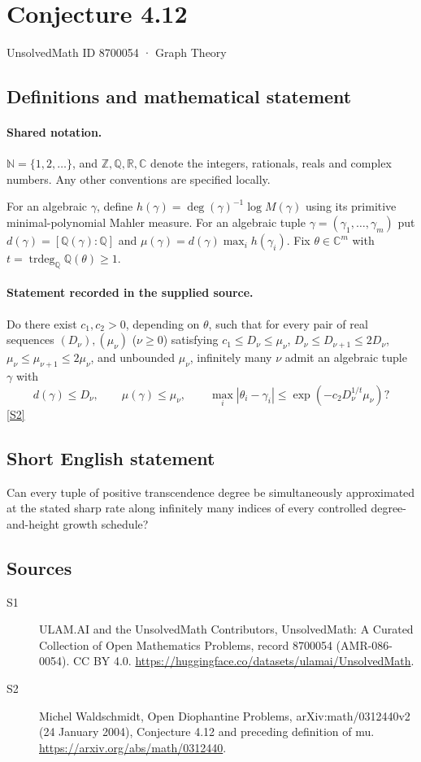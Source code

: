 \documentclass[11pt]{article}
\newcommand{\sref}[2]{\hyperlink{source:#1:#2}{[S#2]}}
\begin{document}
\setcounter{section}{8700053}
\section{Conjecture 4.12}\label{8700054}
{\small\sffamily UnsolvedMath ID 8700054 · Graph Theory}
\subsection{Definitions and mathematical statement}

\paragraph{Shared notation.}$\mathbb N=\{1,2,\ldots\}$, and $\mathbb Z,\mathbb Q,\mathbb R,\mathbb C$ denote the integers, rationals, reals and complex numbers. Any other conventions are specified locally.


For an algebraic $\gamma$, define $h(\gamma)=\deg(\gamma)^{-1}\log M(\gamma)$ using its primitive minimal-polynomial Mahler measure. For an algebraic tuple $\gamma=(\gamma_1,\ldots,\gamma_m)$ put $d(\gamma)=[\mathbb Q(\gamma):\mathbb Q]$ and $\mu(\gamma)=d(\gamma)\max_i h(\gamma_i)$. Fix $\theta\in\mathbb C^m$ with $t=\operatorname{trdeg}_{\mathbb Q}\mathbb Q(\theta)\ge1$.
\paragraph{Statement recorded in the supplied source.}
Do there exist $c_1,c_2>0$, depending on $\theta$, such that for every pair of real sequences $(D_\nu),(\mu_\nu)$ ($\nu\ge0$) satisfying $c_1\le D_\nu\le\mu_\nu$, $D_\nu\le D_{\nu+1}\le2D_\nu$, $\mu_\nu\le\mu_{\nu+1}\le2\mu_\nu$, and unbounded $\mu_\nu$, infinitely many $\nu$ admit an algebraic tuple $\gamma$ with \[d(\gamma)\le D_\nu,\qquad \mu(\gamma)\le\mu_\nu,\qquad \max_i|\theta_i-\gamma_i|\le\exp(-c_2D_\nu^{1/t}\mu_\nu)?\] \sref{8700054}{2}
\subsection{Short English statement}
Can every tuple of positive transcendence degree be simultaneously approximated at the stated sharp rate along infinitely many indices of every controlled degree-and-height growth schedule?
\subsection{Sources}
\begin{description}
\item[\hypertarget{source:8700054:1}{S1}] ULAM.AI and the UnsolvedMath Contributors, UnsolvedMath: A Curated Collection of Open Mathematics Problems, record 8700054 (AMR-086-0054). CC BY 4.0. \url{https://huggingface.co/datasets/ulamai/UnsolvedMath}.
\item[\hypertarget{source:8700054:2}{S2}] Michel Waldschmidt, Open Diophantine Problems, arXiv:math/0312440v2 (24 January 2004), Conjecture 4.12 and preceding definition of mu. \url{https://arxiv.org/abs/math/0312440}.
\end{description}
\label{end:8700054}
\end{document}
